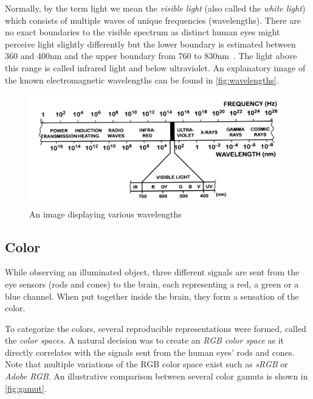 Normally, by the term light we mean the \emph{visible light} (also called the \emph{white light}) which consists of multiple waves of unique frequencies (wavelengths). There are no exact boundaries to the visible spectrum as distinct human eyes might perceive light slightly differently but the lower boundary is estimated between 360 and 400nm and the upper boundary from 760 to 830nm~\cite{sliney2016light}. The light above this range is called infrared light and below ultraviolet. An explanatory image of the known electromagnetic wavelengths can be found in \autoref{fig:wavelengths}.

\begin{figure}[h]
	\centering
	\includegraphics[width=0.8\linewidth]{img/wavelengths.png}
	\caption{An image displaying various wavelengths~\cite{colorScienceSlides}}
	\label{fig:wavelengths}
\end{figure}

\subsection{Color}

While observing an illuminated object, three different signals are sent from the eye sensors (rods and cones) to the brain, each representing a red, a green or a blue channel. When put together inside the brain, they form a sensation of the color. 

To categorize the colors, several reproducible representations were formed, called the \emph{color spaces}. A natural decision was to create an \emph{RGB color space} as it directly correlates with the signals sent from the human eyes' rods and cones. Note that multiple variations of the RGB color space exist such as \emph{sRGB} or \emph{Adobe RGB}. An illustrative comparison between several color gamuts is shown in \autoref{fig:gamut}.

